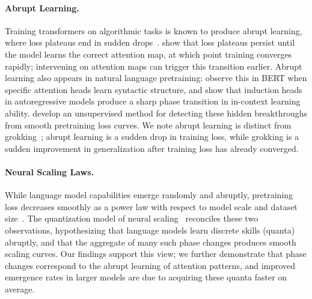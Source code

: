 \documentclass{article}
\begin{document}
\paragraph{Abrupt Learning.}
Training transformers on algorithmic tasks is known to produce abrupt learning, where loss plateaus end in sudden drops~\citep{gopalani2024abruptlearningtransformerscase}. \citet{gopalani2025happenslossplateauunderstanding} show that loss plateaus persist until the model learns the correct attention map, at which point training converges rapidly; intervening on attention maps can trigger this transition earlier. Abrupt learning also appears in natural language pretraining: \citet{chen2025suddendropslosssyntax} observe this in BERT when specific attention heads learn syntactic structure, and \citet{olsson2022incontextlearninginductionheads} show that induction heads in autoregressive models produce a sharp phase transition in in-context learning ability. \citet{kangaslahti2026hiddenbreakthroughslanguagemodel} develop an unsupervised method for detecting these hidden breakthroughs from smooth pretraining loss curves. We note abrupt learning is distinct from grokking~\citep{power2022grokkinggeneralizationoverfittingsmall, nanda2023progressmeasuresgrokkingmechanistic}; abrupt learning is a sudden drop in training loss, while grokking is a sudden improvement in generalization after training loss has already converged.

\paragraph{Neural Scaling Laws.} 
While language model capabilities emerge randomly and abruptly, pretraining loss decreases smoothly as a power law with respect to model scale and dataset size~\citep{hestness2017deeplearningscalingpredictable,kaplan2020scalinglawsneurallanguage}. The quantization model of neural scaling~\citep{michaud2024quantizationmodelneuralscaling} reconciles these two observations, hypothesizing that language models learn discrete skills (quanta) abruptly, and that the aggregate of many such phase changes produces smooth scaling curves. Our findings support this view; we further demonstrate that phase changes correspond to the abrupt learning of attention patterns, and improved emergence rates in larger models are due to acquiring these quanta faster on average.
\end{document}
